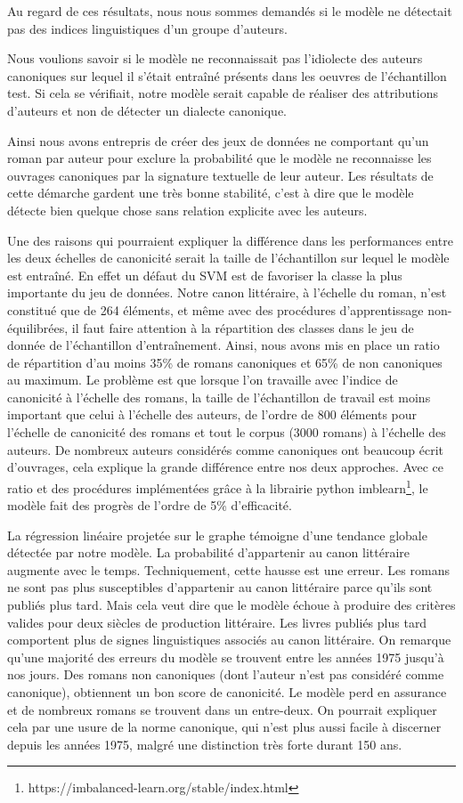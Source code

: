 Au regard de ces résultats, nous nous sommes demandés si le modèle ne détectait pas des indices linguistiques d'un groupe d'auteurs. 

Nous voulions savoir si le modèle ne reconnaissait pas l'idiolecte des auteurs canoniques sur lequel il s'était entraîné présents dans les oeuvres de l'échantillon test. Si cela se vérifiait, notre modèle serait capable de réaliser des attributions d'auteurs et non de détecter un dialecte canonique. 

Ainsi nous avons entrepris de créer des jeux de données ne comportant qu'un roman par auteur pour exclure la probabilité que le modèle ne reconnaisse les ouvrages canoniques par la signature textuelle de leur auteur. Les résultats de cette démarche gardent une très bonne stabilité, c'est à dire que le modèle détecte bien quelque chose sans relation explicite avec les auteurs. 

Une des raisons qui pourraient expliquer la différence dans les performances entre les deux échelles de canonicité serait la taille de l'échantillon sur lequel le modèle est entraîné. En effet un défaut du SVM est de favoriser la classe la plus importante du jeu de données. Notre canon littéraire, à l'échelle du roman, n'est constitué que de 264 éléments, et même avec des procédures d'apprentissage non-équilibrées, il faut faire attention à la répartition des classes dans le jeu de donnée de l'échantillon d'entraînement. Ainsi, nous avons mis en place un ratio de répartition d'au moins 35\% de romans canoniques et 65\% de non canoniques au maximum. Le problème est que lorsque l'on travaille avec l'indice de canonicité à l'échelle des romans, la taille de l'échantillon de travail est moins important que celui à l'échelle des auteurs, de l'ordre de 800 éléments pour l'échelle de canonicité des romans et tout le corpus (3000 romans) à l'échelle des auteurs. De nombreux auteurs considérés comme canoniques ont beaucoup écrit d'ouvrages, cela explique la grande différence entre nos deux approches. Avec ce ratio et des procédures implémentées grâce à la librairie python imblearn\footnote{https://imbalanced-learn.org/stable/index.html}, le modèle fait des progrès de l'ordre de 5\% d'efficacité.

La régression linéaire projetée sur le graphe témoigne d'une tendance globale détectée par notre modèle. La probabilité d'appartenir au canon littéraire augmente avec le temps. Techniquement, cette hausse est une erreur. Les romans ne sont pas plus susceptibles d'appartenir au canon littéraire parce qu'ils sont publiés plus tard. Mais cela veut dire que le modèle échoue à produire des critères valides pour deux siècles de production littéraire. Les livres publiés plus tard comportent plus de signes linguistiques associés au canon littéraire. On remarque qu'une majorité des erreurs du modèle se trouvent entre les années 1975 jusqu'à nos jours. Des romans non canoniques (dont l'auteur n'est pas considéré comme canonique), obtiennent un bon score de canonicité. Le modèle perd en assurance et de nombreux romans se trouvent dans un entre-deux. On pourrait expliquer cela par une usure de la norme canonique, qui n'est plus aussi facile à discerner depuis les années 1975, malgré une distinction très forte durant 150 ans. 

